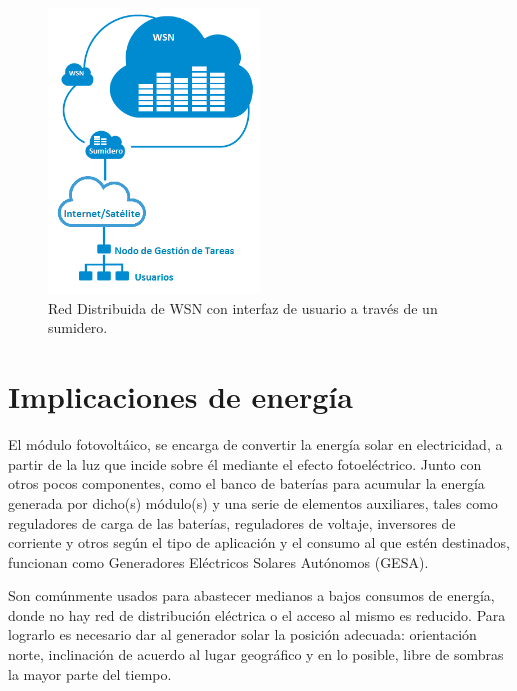 \begin{figure}[h!]
	\centering
    \includegraphics[width=0.5\textwidth]{./Figures/RedDistribuida.png}
    	\caption{Red Distribuida de WSN con interfaz de usuario a través de un sumidero.}
	\label{fig:distrib}
\end{figure} 

\section{Implicaciones de energía}
\label{sec:energía}

El módulo fotovoltáico, se encarga de convertir la energía solar en electricidad, a partir de la luz que incide sobre él mediante el efecto fotoeléctrico. Junto con otros pocos componentes, como el banco de baterías para acumular la energía generada por dicho(s) módulo(s) y una serie de elementos auxiliares, tales como reguladores de carga de las baterías, reguladores de voltaje, inversores de corriente y otros según el tipo de aplicación y el consumo al que estén destinados, funcionan como Generadores Eléctricos Solares Autónomos (GESA).

Son comúnmente usados para abastecer medianos a bajos consumos de energía, donde no hay red de distribución eléctrica o el acceso al mismo es reducido. Para lograrlo es necesario dar al generador solar la posición adecuada: orientación norte, inclinación de acuerdo al lugar geográfico y en lo posible, libre de sombras la mayor parte del tiempo.

